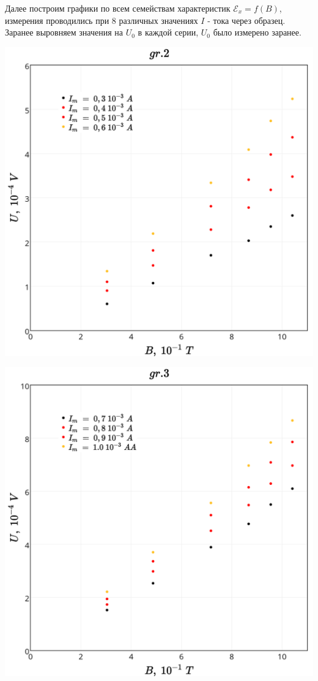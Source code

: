 Далее построим графики по всем семействам характеристик $\mathscr{E}_x = f(B)$, измерения проводились при 8 различных значениях $I$ - тока через образец. Заранее выровняем значения на $U_0$ в каждой серии, $U_0$ было измерено заранее.

\includegraphics[scale = 0.20]{my_plot2.png}

\includegraphics[scale = 0.20]{my_plot3.png}

